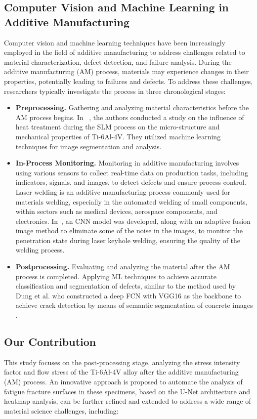 \documentclass{ieeeaccess}
\begin{document}
\subsection{Computer Vision and Machine Learning in Additive Manufacturing}
Computer vision and machine learning techniques have been increasingly employed in the field of additive manufacturing to address challenges related to material characterization, defect detection, and failure analysis. During the additive manufacturing (AM) process, materials may experience changes in their properties, potentially leading to failures and defects. To address these challenges, researchers typically investigate the process in three chronological stages:
\begin{itemize}
    \item \textbf{Preprocessing.} Gathering and analyzing material characteristics before the AM process begins. In ~\cite{miyazaki2019image}, the authors conducted a study on the influence of heat treatment during the SLM process on the micro-structure and mechanical properties of Ti-6Al-4V. They utilized machine learning techniques for image segmentation and analysis.
    \item \textbf{In-Process Monitoring.} Monitoring in additive manufacturing involves using various sensors to collect real-time data on production tasks, including indicators, signals, and images, to detect defects and ensure process control. Laser welding is an additive manufacturing process commonly used for materials welding, especially in the automated welding of small components, within sectors such as medical devices, aerospace components, and electronics. In~\cite{cai2023real}, an CNN model was developed, along with an adaptive fusion image method to eliminate some of the noise in the images, to monitor the penetration state during laser keyhole welding, ensuring the quality of the welding process.
    \item \textbf{Postprocessing.} Evaluating and analyzing the material after the AM process is completed. Applying ML techniques to achieve accurate classification and segmentation of defects, similar to the method used by Dung et al. who constructed a deep FCN with VGG16 as the backbone to achieve crack detection by means of semantic segmentation of concrete images \cite{pu2022autonomous}.
\end{itemize}

\subsection{Our Contribution}
This study focuses on the post-processing stage, analyzing the stress intensity factor and flow stress of the Ti-6Al-4V alloy after the additive manufacturing (AM) process. An innovative approach is proposed to automate the analysis of fatigue fracture surfaces in these specimens, based on the U-Net architecture and heatmap analysis, can be further refined and extended to address a wide range of material science challenges, including:
\end{document}
